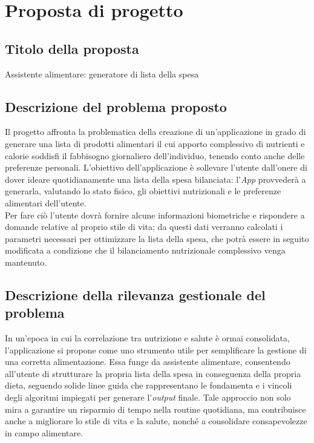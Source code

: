 \documentclass[11pt,a4paper]{article}
\begin{document}
\tableofcontents
\newpage

\section{Proposta di progetto}

\subsection{Titolo della proposta}
Assistente alimentare: generatore di lista della spesa

\subsection{Descrizione del problema proposto}
Il progetto affronta la problematica della creazione di un’applicazione in grado di generare una lista di prodotti alimentari il cui apporto complessivo di nutrienti e calorie soddisfi il fabbisogno giornaliero dell’individuo, tenendo conto anche delle preferenze personali. L’obiettivo dell’applicazione è sollevare l’utente dall'onere di dover ideare quotidianamente una lista della spesa bilanciata: l’\textit{App} provvederà a generarla, valutando lo stato fisico, gli obiettivi nutrizionali e le preferenze alimentari dell’utente.\\
Per fare ciò l’utente dovrà fornire alcune informazioni biometriche e rispondere a domande relative al proprio stile di vita; da questi dati verranno calcolati i parametri necessari per ottimizzare la lista della spesa, che potrà essere in seguito modificata a condizione che il bilanciamento nutrizionale complessivo venga mantenuto.

\subsection{Descrizione della rilevanza gestionale del problema}
In un’epoca in cui la correlazione tra nutrizione e salute è ormai consolidata, l’applicazione si propone come uno strumento utile per semplificare la gestione di una corretta alimentazione. Essa funge da assistente alimentare, consentendo all’utente di strutturare la propria lista della spesa in conseguenza della propria dieta, seguendo solide linee guida che rappresentano le fondamenta e i vincoli degli algoritmi impiegati per generare l’\textit{output} finale. Tale approccio non solo mira a garantire un risparmio di tempo nella routine quotidiana, ma contribuisce anche a migliorare lo stile di vita e la salute, nonché a consolidare consapevolezze in campo alimentare.
\end{document}
